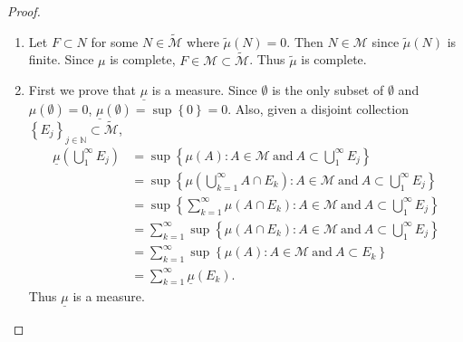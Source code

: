 \documentclass{article}
\theoremstyle{definition}
\begin{document}
\begin{proof}
\begin{enumerate}[label=\textbf{\alph*.}]
		      Now we show that $\widetilde{\mu}$ is saturated.
		      Let $E \in X$ locally measurable over $\widetilde{\mu}$.
		      We want to show that $E \in \widetilde{\mathscr{M}}$.
		      Let $A \in \mathscr{M}$ such that $\mu(A) < \infty$.
		      Then since $A \in \widetilde{\mathscr{M}}$, $E \cap A \in \widetilde{\mathscr{M}}$, and by monotonicity \begin{equation*}
			      \widetilde{\mu}(E \cap A) < \widetilde{\mu}(A) = \mu(A) < \infty.
		      \end{equation*}
		      Thus since $\widetilde{\mu}(E \cap A)$ is finite, $E \cap A \in \mathscr{M}$.
		      Therefore $E \in \widetilde{\mathscr{M}}$.
		\item Let $F \subset N$ for some $N \in \widetilde{\mathscr{M}}$ where $\widetilde{\mu}(N) = 0$.
		      Then $N \in \mathscr{M}$ since $\widetilde{\mu}(N)$ is finite.
		      Since $\mu$ is complete, $F \in \mathscr{M} \subset \widetilde{\mathscr{M}}$.
		      Thus $\widetilde{\mu}$ is complete.
		\item First we prove that $\underline{\mu}$ is a measure.
		      Since $\emptyset$ is the only subset of $\emptyset$ and $\mu(\emptyset) = 0$, $\underline{\mu}(\emptyset) = \sup \left\lbrace 0 \right\rbrace = 0$.
		      Also, given a disjoint collection $\left\lbrace E_j \right\rbrace_{j \in \mathbb{N}} \subset \widetilde{\mathscr{M}}$, \begin{align*}
			      \underline{\mu}\left( \bigcup_1^\infty E_j \right) & = \sup \left\lbrace \mu(A) : A \in \mathscr{M}\ \mathrm{and}\ A \subset \bigcup_1^\infty E_j \right\rbrace                                                \\
			                                                         & = \sup \left\lbrace \mu \left( \bigcup_{k = 1}^\infty A \cap E_k \right)  : A \in \mathscr{M}\ \mathrm{and}\ A \subset \bigcup_1^\infty E_j \right\rbrace \\
			                                                         & = \sup \left\lbrace \sum_{k = 1}^\infty \mu \left( A \cap E_k \right) : A \in \mathscr{M}\ \mathrm{and}\ A \subset \bigcup_1^\infty E_j \right\rbrace     \\
			                                                         & = \sum_{k = 1}^\infty \sup \left\lbrace \mu \left( A \cap E_k \right) : A \in \mathscr{M}\ \mathrm{and}\ A \subset \bigcup_1^\infty E_j \right\rbrace     \\
			                                                         & = \sum_{k = 1}^\infty \sup \left\lbrace \mu(A) : A \in \mathscr{M}\ \mathrm{and}\ A \subset E_k \right\rbrace                                             \\
			                                                         & = \sum_{k = 1}^\infty \underline{\mu}(E_k).
		      \end{align*}
		      Thus $\underline{\mu}$ is a measure.


\end{enumerate}
\end{proof}
\end{document}
